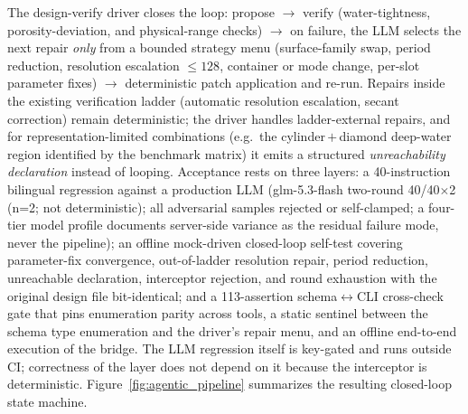 \documentclass[5p,times,authoryear]{elsarticle}
\begin{document}
The design-verify driver closes the loop: propose $\to$ verify (water-tightness, porosity-deviation,
and physical-range checks) $\to$ on failure, the LLM selects the next repair \emph{only} from a
bounded strategy menu (surface-family swap, period reduction, resolution escalation $\le128$,
container or mode change, per-slot parameter fixes) $\to$ deterministic patch application and
re-run. Repairs inside the existing verification ladder (automatic resolution escalation, secant
correction) remain deterministic; the driver handles ladder-external repairs, and for
representation-limited combinations (e.g.\ the cylinder\,$+$\,diamond deep-water region identified
by the benchmark matrix) it emits a structured \emph{unreachability declaration} instead of
looping. Acceptance rests on three layers: a 40-instruction bilingual regression against a
production LLM (glm-5.3-flash two-round 40/40$\times$2 (n=2; not deterministic); all adversarial samples rejected or
self-clamped; a four-tier model profile documents server-side variance as the residual failure
mode, never the pipeline); an offline mock-driven
closed-loop self-test covering parameter-fix convergence, out-of-ladder resolution repair, period
reduction, unreachable declaration, interceptor rejection, and round exhaustion with the original
design file bit-identical; and a 113-assertion schema$\leftrightarrow$CLI cross-check gate that pins
enumeration parity across tools, a static sentinel between the schema type enumeration and the
driver's repair menu, and an offline end-to-end execution of the bridge. The LLM regression itself
is key-gated and runs outside CI; correctness of the layer does not depend on it because the
interceptor is deterministic. Figure~\ref{fig:agentic_pipeline} summarizes the resulting
closed-loop state machine.
\end{document}
